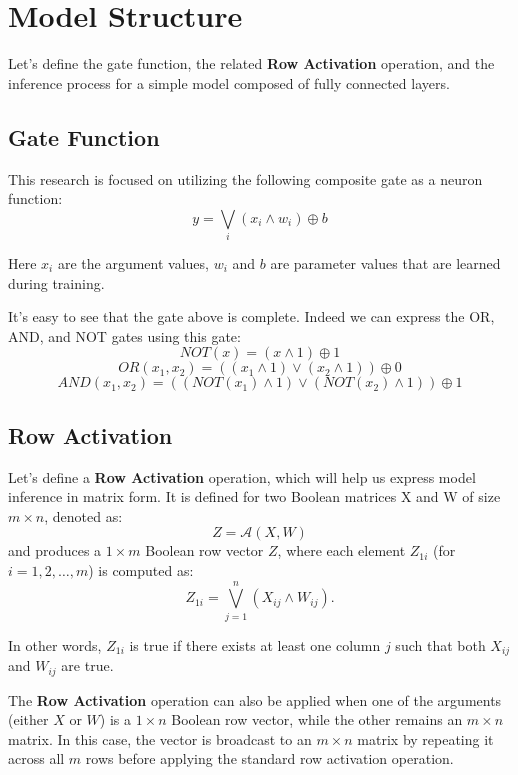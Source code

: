 \documentclass{article}
\begin{document}
\section{Model Structure}
Let's define the gate function, the related \textbf{Row Activation} operation, and the inference process for a simple model composed of fully connected layers.

\subsection{Gate Function}
This research is focused on utilizing the following composite gate as a neuron function:
\[ y = \bigvee_{i} \left( x_{i} \wedge w_{i} \right) \oplus b \]

Here \(x_{i}\) are the argument values, \(w_{i}\) and \(b\) are parameter values that are learned during training.

It's easy to see that the gate above is complete. Indeed we can  express the OR, AND, and NOT gates using this gate:
\[ NOT(x) = \left( x \wedge 1 \right) \oplus 1 \]
\[ OR(x_1, x_2) = \left(\left( x_1 \wedge 1 \right) \vee \left( x_2 \wedge 1 \right) \right) \oplus 0 \]
\[ AND(x_1, x_2) = \left(\left( NOT(x_1) \wedge 1 \right) \vee \left( NOT(x_2) \wedge 1 \right) \right) \oplus 1 \]

\subsection{Row Activation}
Let's define a \textbf{Row Activation} operation, which will help us express model inference in matrix form. It is defined for two Boolean matrices X and W of size \( m \times n \), denoted as:
\[ Z = \mathcal{A}(X, W) \]
and produces a \( 1 \times m \) Boolean row vector \( Z \), where each element \( Z_{1i} \) (for \( i = 1, 2, \dots, m \)) is computed as:
\[ Z_{1i} = \bigvee_{j=1}^{n} \left( X_{ij} \wedge W_{ij} \right). \]

In other words, \( Z_{1i} \) is true if there exists at least one column \( j \) such that both \( X_{ij} \) and \( W_{ij} \) are true.

The \textbf{Row Activation} operation can also be applied when one of the arguments (either \( X \) or \( W \)) is a \( 1 \times n \) Boolean row vector, while the other remains an \( m \times n \) matrix. In this case, the vector is broadcast to an \( m \times n \) matrix by repeating it across all \( m \) rows before applying the standard row activation operation.
\end{document}
